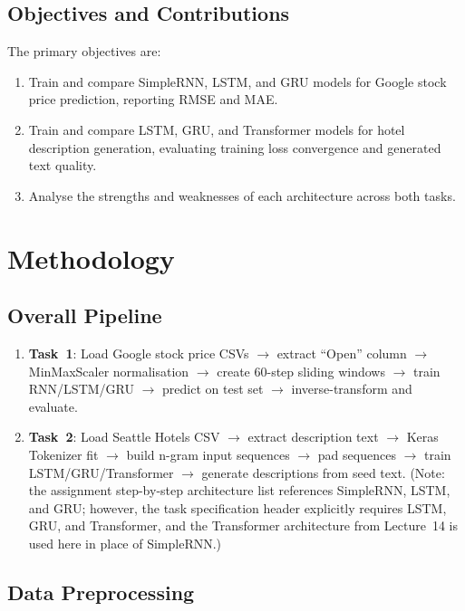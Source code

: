 \documentclass[11pt,letterpaper]{article}
\begin{document}
\subsection{Objectives and Contributions}

The primary objectives are:
\begin{enumerate}[noitemsep]
  \item Train and compare SimpleRNN, LSTM, and GRU models for Google stock price
        prediction, reporting RMSE and MAE.
  \item Train and compare LSTM, GRU, and Transformer models for hotel description
        generation, evaluating training loss convergence and generated text quality.
  \item Analyse the strengths and weaknesses of each architecture across both tasks.
\end{enumerate}

\section{Methodology}

\subsection{Overall Pipeline}

\begin{enumerate}[noitemsep]
  \item \textbf{Task~1}: Load Google stock price CSVs $\to$ extract ``Open'' column
        $\to$ MinMaxScaler normalisation $\to$ create 60-step sliding windows $\to$
        train RNN/LSTM/GRU $\to$ predict on test set $\to$ inverse-transform and
        evaluate.
  \item \textbf{Task~2}: Load Seattle Hotels CSV $\to$ extract description text $\to$
        Keras Tokenizer fit $\to$ build n-gram input sequences $\to$ pad sequences
        $\to$ train LSTM/GRU/Transformer $\to$ generate descriptions from seed text.
        (Note: the assignment step-by-step architecture list references SimpleRNN,
        LSTM, and GRU; however, the task specification header explicitly requires
        LSTM, GRU, and Transformer, and the Transformer architecture from
        Lecture~14 is used here in place of SimpleRNN.)
\end{enumerate}

\subsection{Data Preprocessing}
\end{document}
